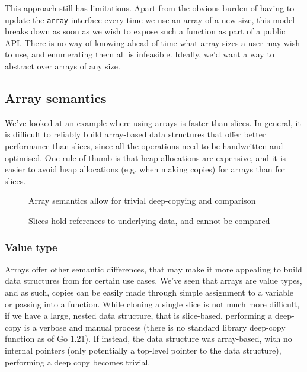 
This approach still has limitations. Apart from the obvious burden of having to
update the \texttt{array} interface every time we use an array of a new size,
this model breaks down as soon as we wish to expose such a function as part of a
public API. There is no way of knowing ahead of time what array sizes a user may
wish to use, and enumerating them all is infeasible. Ideally, we'd want a way to
abstract over arrays of any size.

\subsection{Array semantics}

We've looked at an example where using arrays is faster than slices. In general,
it is difficult to reliably build array-based data structures that offer better
performance than slices, since all the operations need to be handwritten and
optimised. One rule of thumb is that heap allocations are expensive, and it is
easier to avoid heap allocations (e.g. when making copies) for arrays than for
slices.

\begin{figure}
	\caption{Array semantics allow for trivial deep-copying and comparison}
\end{figure}

\begin{figure}
	\caption{Slices hold references to underlying data, and cannot be compared}
\end{figure}

\subsubsection{Value type}

Arrays offer other semantic differences, that may make it more appealing to
build data structures from for certain use cases. We've seen that arrays are
value types, and as such, copies can be easily made through simple assignment to
a variable or passing into a function. While cloning a single slice is not much
more difficult, if we have a large, nested data structure, that is slice-based,
performing a deep-copy is a verbose and manual process (there is no standard
library deep-copy function as of Go 1.21). If instead, the data structure was
array-based, with no internal pointers (only potentially a top-level pointer to
the data structure), performing a deep copy becomes trivial.

